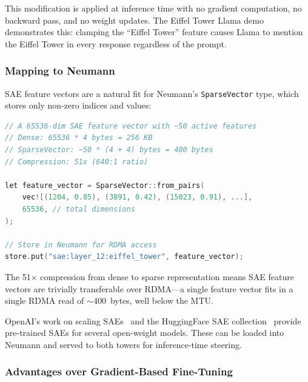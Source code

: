 \documentclass[11pt,letterpaper]{article}
\theoremstyle{definition}
\begin{document}
This modification is applied at inference time with no gradient computation, no backward pass, and no weight updates. The Eiffel Tower Llama demo~\cite{eiffel-tower-llama} demonstrates this: clamping the ``Eiffel Tower'' feature causes Llama to mention the Eiffel Tower in every response regardless of the prompt.

\subsubsection{Mapping to Neumann}

SAE feature vectors are a natural fit for Neumann's \texttt{SparseVector} type, which stores only non-zero indices and values:
\begin{lstlisting}[language=C, caption={SAE features as Neumann SparseVectors}]
// A 65536-dim SAE feature vector with ~50 active features
// Dense: 65536 * 4 bytes = 256 KB
// SparseVector: ~50 * (4 + 4) bytes = 400 bytes
// Compression: 51x (640:1 ratio)

let feature_vector = SparseVector::from_pairs(
    vec![(1204, 0.85), (3891, 0.42), (15023, 0.91), ...],
    65536, // total dimensions
);

// Store in Neumann for RDMA access
store.put("sae:layer_12:eiffel_tower", feature_vector);
\end{lstlisting}

The 51$\times$ compression from dense to sparse representation means SAE feature vectors are trivially transferable over RDMA---a single feature vector fits in a single RDMA read of $\sim$400~bytes, well below the MTU.

OpenAI's work on scaling SAEs~\cite{openai-sae-scaling} and the HuggingFace SAE collection~\cite{sae-collection} provide pre-trained SAEs for several open-weight models. These can be loaded into Neumann and served to both towers for inference-time steering.

\subsubsection{Advantages over Gradient-Based Fine-Tuning}
\end{document}
